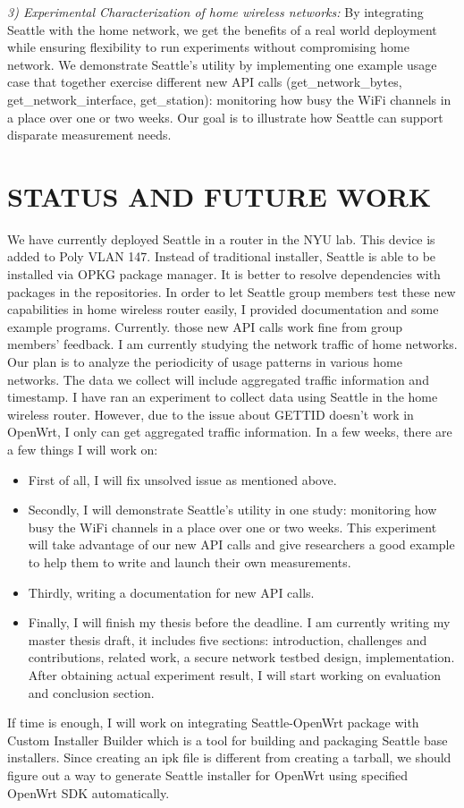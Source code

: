\documentclass[conference]{IEEEtran}   	%
\begin{document}
\textit{3) Experimental Characterization of home wireless networks: } By integrating Seattle with the home network, we get the benefits of a real world deployment while ensuring flexibility to run experiments without compromising home network. We demonstrate Seattle's utility by implementing one example usage case that together exercise different new API calls (get\_network\_bytes, get\_network\_interface, get\_station): monitoring how busy the WiFi channels in a place over one or two weeks. Our goal is to illustrate how Seattle can support disparate measurement needs.

\section{STATUS AND FUTURE WORK}
We have currently deployed Seattle in a router in the NYU lab. This device is added to Poly VLAN 147. Instead of traditional installer, Seattle is able to be installed via OPKG package manager\cite{opkg}\cite{seattle-openwrt}. It is better to resolve dependencies with packages in the repositories. In order to let Seattle group members test these new capabilities in home wireless router easily, I provided documentation and some example programs\cite{test}. Currently. those new API calls work fine from group members' feedback. I am currently studying the network traffic of home networks. Our plan is to analyze the periodicity of usage patterns in various home networks. The data we collect will include aggregated traffic information and timestamp. I have ran an experiment to collect data using Seattle in the home wireless router. However, due to the issue\cite{gettid_issue} about GETTID doesn't work in OpenWrt, I only can get aggregated traffic information.
\newline
In a few weeks, there are a few things I will work on:
\begin{itemize}
\item First of all, I will fix unsolved issue as mentioned above.
\item Secondly, I will demonstrate Seattle's utility in one study: monitoring how busy the WiFi channels in a place over one or two weeks. This experiment will take advantage of our new API calls and give researchers a good example to help them to write and launch their own measurements. 
\item Thirdly, writing a documentation for new API calls. 
\item Finally, I will finish my thesis before the deadline. I am currently writing my master thesis draft, it includes five sections: introduction, challenges and contributions, related work, a secure network testbed design, implementation. After obtaining actual experiment result, I will start working on evaluation and conclusion section. 
\end{itemize}  
If time is enough, I will work on integrating Seattle-OpenWrt package with Custom Installer Builder which is a tool for building and packaging Seattle base installers. Since creating an ipk file is different from creating a tarball, we should figure out a way to generate Seattle installer for OpenWrt using specified OpenWrt SDK automatically. 


\end{document}
